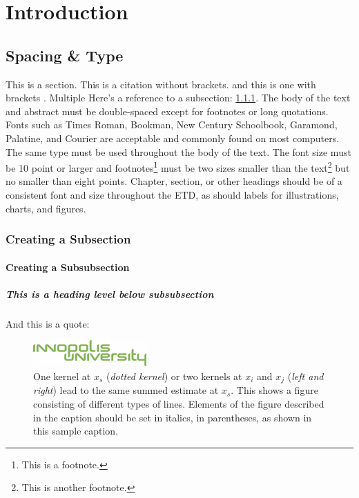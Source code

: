 \chapter{Introduction}
\label{chap:intro}
\section{Spacing \& Type}
\label{sec:section}

This is a section. This is a citation without brackets. and this is one with brackets \cite{A}. Multiple \cite{A,B,C} Here's a reference to a subsection: \ref{sec:subsection}. The body of the text and abstract must be double-spaced except for footnotes or long quotations. Fonts such as Times Roman, Bookman, New Century Schoolbook, Garamond, Palatine, and Courier are acceptable and commonly found on most computers. The same type must be used throughout the body of the text. The font size must be 10 point or larger and footnotes\footnote{This is a footnote.} must be two sizes smaller than the text\footnote{This is another footnote.} but no smaller than eight points. Chapter, section, or other headings should be of a consistent font and size throughout the ETD, as should labels for illustrations, charts, and figures.  

\subsection{Creating a Subsection}
\label{sec:subsection}

\subsubsection{Creating a Subsubsection}

\paragraph{This is a heading level below subsubsection}

And this is a quote: 
%
\begin{quote}
\blindtext
\end{quote}

\begin{figure}
\centering
\includegraphics[]{figs/inno.png}
\caption{One kernel at $x_s$ (\emph{dotted kernel}) or two kernels at
$x_i$ and $x_j$ (\textit{left and right}) lead to the same summed estimate
at $x_s$. This shows a figure consisting of different types of
lines. Elements of the figure described in the caption should be set in
italics, in parentheses, as shown in this sample caption.}
\label{fig:example}
\end{figure}

